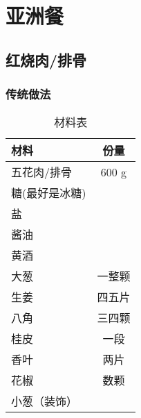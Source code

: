\chapter{亚洲餐}

\section{红烧肉/排骨}

\subsection{传统做法}

\begin{table}[h]
    \centering
    \begin{tabular}{|l||c|}\hline
     \textbf{材料}    &  \textbf{份量}\\ \hline\hline
    五花肉/排骨     &  600 g \\ \hline
    糖(最好是冰糖)     &   \\ \hline
    盐     &    \\ \hline
    酱油     &   \\ \hline
    黄酒     &   \\ \hline
    大葱     &  一整颗 \\ \hline
    生姜     &  四五片 \\ \hline
    八角     &  三四颗 \\ \hline
    桂皮     &  一段\\ \hline
    香叶     &  两片 \\ \hline
    花椒     &  数颗 \\ \hline
    小葱（装饰）     &   \\ \hline
    \end{tabular}
    \caption{材料表}
\end{table}

